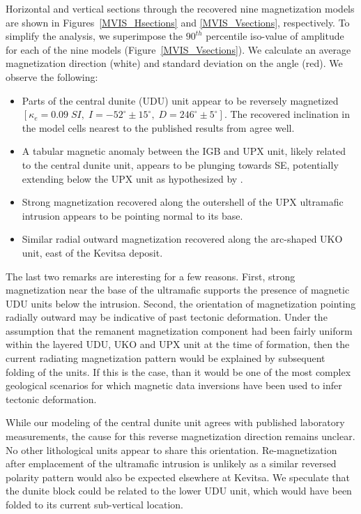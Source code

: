 \documentclass[paper]{geophysics}
\begin{document}
Horizontal and vertical sections through the recovered nine magnetization models are shown in Figures~\ref{MVIS_Hsections} and \ref{MVIS_Vsections}, respectively.
To simplify the analysis, we superimpose the $90^{th}$ percentile iso-value of amplitude for each of the nine models (Figure~\ref{MVIS_Vsections}). We calculate an average magnetization direction (white) and standard deviation on the angle (red). We observe the following:
\begin{itemize}
\item Parts of the central dunite (UDU) unit appear to be reversely magnetized $[\kappa_{e} = 0.09\;SI, \;I=-52^\circ \pm 15^\circ, \;D=246^\circ \pm 5^\circ]$. The recovered inclination in the model cells nearest to the published results from \cite{Montonen2012} agree well.
\item A tabular magnetic anomaly between the IGB and UPX unit, likely related to the central dunite unit, appears to be plunging towards SE, potentially extending below the UPX unit as hypothesized by \cite{Koivisto2015}.
\item Strong magnetization recovered along the outershell of the UPX ultramafic intrusion appears to be pointing normal to its base.
\item Similar radial outward magnetization recovered along the arc-shaped UKO unit, east of the Kevitsa deposit.
\end{itemize}
The last two remarks are interesting for a few reasons. First, strong magnetization near the base of the ultramafic supports the presence of magnetic UDU units below the intrusion.
Second, the orientation of magnetization pointing radially outward may be indicative of past tectonic deformation.
Under the assumption that the remanent magnetization component had been fairly uniform within the layered UDU, UKO and UPX unit at the time of formation, then the current radiating magnetization pattern would be explained by subsequent folding of the units.
If this is the case, than it would be one of the most complex geological scenarios for which magnetic data inversions have been used to infer tectonic deformation.

While our modeling of the central dunite unit agrees with published laboratory measurements, the cause for this reverse magnetization direction remains unclear. No other lithological units appear to share this orientation. Re-magnetization after emplacement of the ultramafic intrusion is unlikely as a similar reversed polarity pattern would also be expected elsewhere at Kevitsa. We speculate that the dunite block could be related to the lower UDU unit, which would have been folded to its current sub-vertical location.
\end{document}
